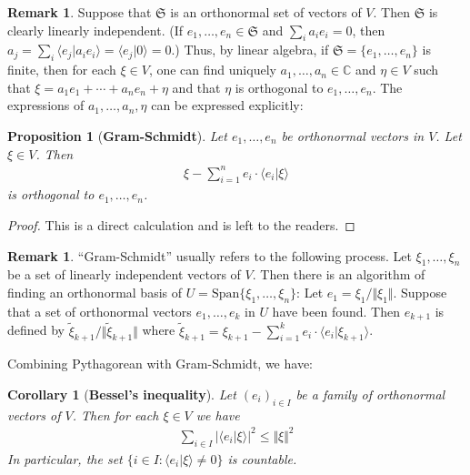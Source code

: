 \documentclass[12pt,b5paper,notitlepage]{article}
\theoremstyle{definition}
\newtheorem{rem}[df]{Remark}
\theoremstyle{plain}
\newtheorem{pp}[df]{Proposition}
\newtheorem{co}[df]{Corollary}
\newcommand{\fk}{\mathfrak}
\newcommand{\wtd}{\widetilde}
\newcommand{\Span}{\mathrm{Span}}
\newcommand{\bk}[1]{\langle {#1}\rangle}
\newcommand{\Cbb}{\mathbb C}
\numberwithin{equation}{section}
\begin{document}
\begin{rem}
Suppose that $\fk S$ is an orthonormal set of vectors of $V$. Then $\fk S$ is clearly linearly independent. (If $e_1,\dots,e_n\in\fk S$ and $\sum_i a_ie_i=0$, then $a_j=\sum_i\bk{e_j|a_ie_i}=\bk{e_j|0}=0$.) Thus, by linear algebra, if $\fk S=\{e_1,\dots,e_n\}$ is finite, then for each $\xi\in V$, one can find uniquely $a_1,\dots,a_n\in\Cbb$ and $\eta\in V$ such that $\xi=a_1e_1+\cdots+a_ne_n+\eta$ and that $\eta$ is orthogonal to $e_1,\dots,e_n$. The expressions of $a_1,\dots,a_n,\eta$ can be expressed explicitly:
\end{rem}


\begin{pp}[\textbf{Gram-Schmidt}]
Let $e_1,\dots,e_n$ be orthonormal vectors in $V$. Let $\xi\in V$. Then
\begin{align}
\xi-\sum_{i=1}^n e_i\cdot \bk{e_i|\xi}
\end{align}
is orthogonal to $e_1,\dots,e_n$.
\end{pp}

\begin{proof}
This is a direct calculation and is left to the readers.
\end{proof}


\begin{rem}\label{lb117}
``Gram-Schmidt'' usually refers to the following process. Let $\xi_1,\dots,\xi_n$ be a set of linearly independent vectors of $V$. Then there is an algorithm of finding an orthonormal basis of $U=\Span\{\xi_1,\dots,\xi_n\}$: Let $e_1=\xi_1/\Vert \xi_1\Vert$. Suppose that a set of orthonormal vectors $e_1,\dots,e_k$ in $U$ have been found. Then $e_{k+1}$ is defined by $\wtd \xi_{k+1}/\Vert\wtd \xi_{k+1}\Vert$ where $\wtd \xi_{k+1}=\xi_{k+1}-\sum_{i=1}^k e_i\cdot\bk{e_i|\xi_{k+1}}$.
\end{rem}



Combining Pythagorean with Gram-Schmidt, we have:
\begin{co}[\textbf{Bessel's inequality}]\label{lb118}
Let $(e_i)_{i\in I}$ be a family of orthonormal vectors of $V$. Then for each $\xi\in V$ we have
\begin{align}\label{eq65}
\sum_{i\in I}|\bk{e_i|\xi}|^2\leq \Vert \xi\Vert^2
\end{align}
In particular, the set $\{i\in I:\bk{e_i|\xi}\neq0\}$ is countable.
\end{co}
\end{document}
